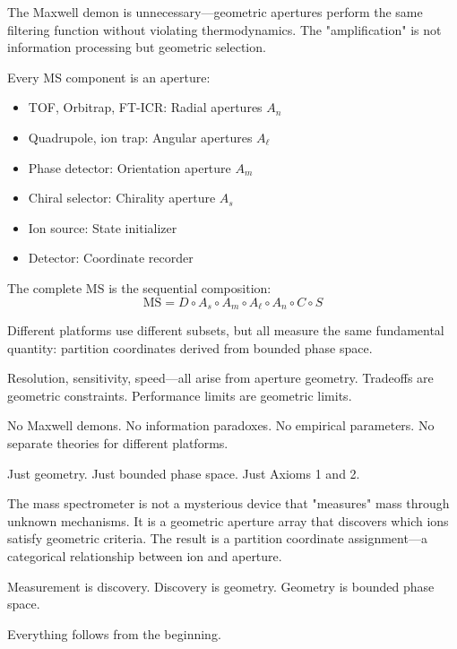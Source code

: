 The Maxwell demon is unnecessary—geometric apertures perform the same filtering function without violating thermodynamics. The "amplification" is not information processing but geometric selection.

Every MS component is an aperture:
\begin{itemize}
    \item TOF, Orbitrap, FT-ICR: Radial apertures $A_n$
    \item Quadrupole, ion trap: Angular apertures $A_\ell$
    \item Phase detector: Orientation aperture $A_m$
    \item Chiral selector: Chirality aperture $A_s$
    \item Ion source: State initializer
    \item Detector: Coordinate recorder
\end{itemize}

The complete MS is the sequential composition:
\begin{equation}
\text{MS} = D \circ A_s \circ A_m \circ A_\ell \circ A_n \circ C \circ S
\end{equation}

Different platforms use different subsets, but all measure the same fundamental quantity: partition coordinates derived from bounded phase space.

Resolution, sensitivity, speed—all arise from aperture geometry. Tradeoffs are geometric constraints. Performance limits are geometric limits.

No Maxwell demons. No information paradoxes. No empirical parameters. No separate theories for different platforms.

Just geometry. Just bounded phase space. Just Axioms 1 and 2.

The mass spectrometer is not a mysterious device that "measures" mass through unknown mechanisms. It is a geometric aperture array that discovers which ions satisfy geometric criteria. The result is a partition coordinate assignment—a categorical relationship between ion and aperture.

Measurement is discovery. Discovery is geometry. Geometry is bounded phase space.

Everything follows from the beginning.

